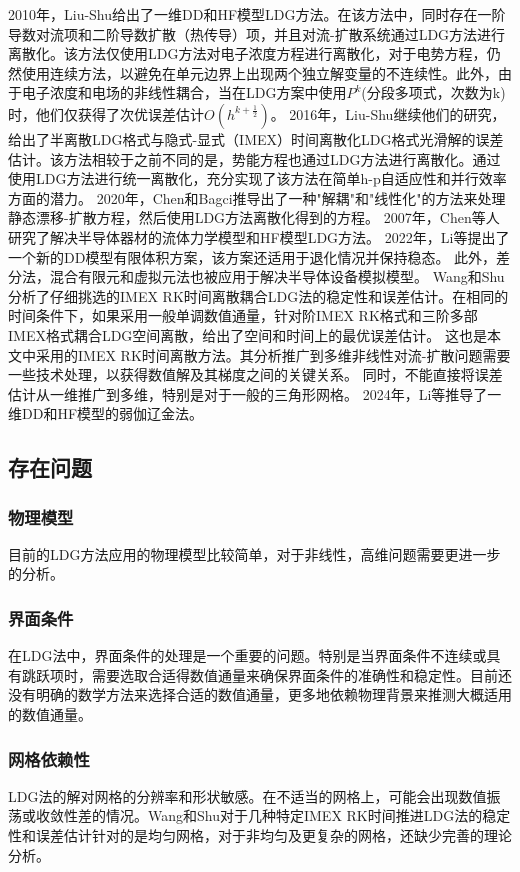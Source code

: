 2010年，Liu-Shu给出了一维DD和HF模型LDG方法\cite{liu2010error}。在该方法中，同时存在一阶导数对流项和二阶导数扩散（热传导）项，并且对流-扩散系统通过LDG方法进行离散化。该方法仅使用LDG方法对电子浓度方程进行离散化，对于电势方程，仍然使用连续方法，以避免在单元边界上出现两个独立解变量的不连续性。此外，由于电子浓度和电场的非线性耦合，当在LDG方案中使用$P^k$(分段多项式，次数为k)时，他们仅获得了次优误差估计$O(h^{k+\frac{1}{2}})$。
2016年，Liu-Shu继续他们的研究，给出了半离散LDG格式与隐式-显式（IMEX）时间离散化LDG格式光滑解的误差估计\cite{liu2016analysis}。该方法相较于之前不同的是，势能方程也通过LDG方法进行离散化。通过使用LDG方法进行统一离散化，充分实现了该方法在简单h-p自适应性和并行效率方面的潜力。
2020年，Chen和Bagci推导出了一种"解耦"和"线性化"的方法来处理静态漂移-扩散方程，然后使用LDG方法离散化得到的方程\cite{chen2020steady}。
2007年，Chen等人研究了解决半导体器材的流体力学模型和HF模型LDG方法\cite{chen2007discontinuous}。
2022年，Li等提出了一个新的DD模型有限体积方案，该方案还适用于退化情况并保持稳态\cite{li2022stabilized}。
此外，差分法\cite{ding2019optimal}，混合有限元\cite{gao2018linearized}和虚拟元法\cite{liu2021virtual}也被应用于解决半导体设备模拟模型。
Wang和Shu分析了仔细挑选的IMEX RK时间离散耦合LDG法的稳定性和误差估计\cite{wang2015stability,wang2016stability}。在相同的时间条件下，如果采用一般单调数值通量，针对阶IMEX RK格式和三阶多部IMEX格式耦合LDG空间离散，给出了空间和时间上的最优误差估计。
这也是本文中采用的IMEX RK时间离散方法。其分析推广到多维非线性对流-扩散问题需要一些技术处理，以获得数值解及其梯度之间的关键关系。
同时，不能直接将误差估计从一维推广到多维，特别是对于一般的三角形网格。
2024年，Li等推导了一维DD和HF模型的弱伽辽金法\cite{li2024weak}。

\subsection{存在问题}
\subsubsection{物理模型}
目前的LDG方法应用的物理模型比较简单，对于非线性，高维问题需要更进一步的分析。
\subsubsection{界面条件}
在LDG法中，界面条件的处理是一个重要的问题。特别是当界面条件不连续或具有跳跃项时，需要选取合适得数值通量来确保界面条件的准确性和稳定性。目前还没有明确的数学方法来选择合适的数值通量，更多地依赖物理背景来推测大概适用的数值通量。
\subsubsection{网格依赖性}
LDG法的解对网格的分辨率和形状敏感。在不适当的网格上，可能会出现数值振荡或收敛性差的情况。Wang和Shu对于几种特定IMEX RK时间推进LDG法的稳定性和误差估计针对的是均匀网格，对于非均匀及更复杂的网格，还缺少完善的理论分析。
